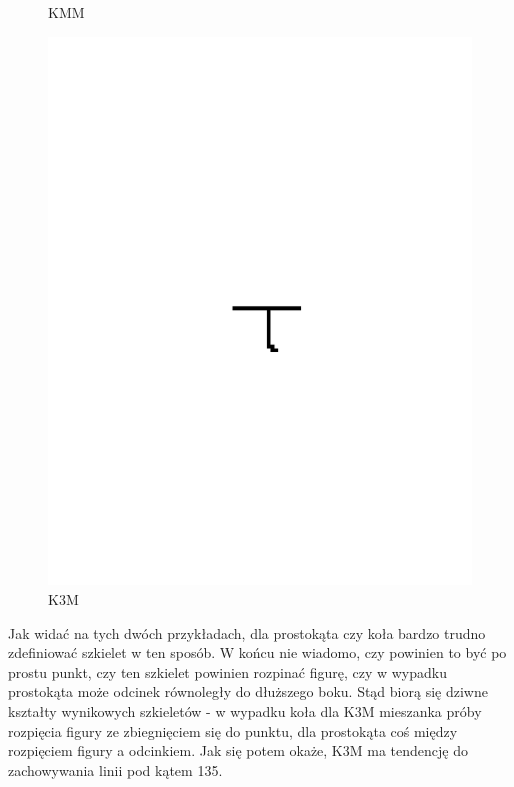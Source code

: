 \documentclass[11pt]{article}
\begin{document}
\begin{figure}[!ht]
\begin{minipage}[b]{0.5\linewidth}
    \caption{KMM} 
    \vspace{4ex}
  \end{minipage}%
  \begin{minipage}[b]{0.5\linewidth}
    \centering
    \includegraphics[width=.5\linewidth]{../samples/circle_k3m} 
    \caption{K3M} 
    \vspace{4ex}
  \end{minipage} 
\end{figure}
\FloatBarrier

\par
Jak widać na tych dwóch przykładach, dla prostokąta czy koła bardzo trudno zdefiniować szkielet w ten sposób. W końcu nie wiadomo, czy powinien to być po prostu punkt, czy ten szkielet powinien rozpinać figurę, czy w wypadku prostokąta może odcinek równoległy do dłuższego boku. Stąd biorą się dziwne kształty wynikowych szkieletów - w wypadku koła dla K3M mieszanka próby rozpięcia figury ze zbiegnięciem się do punktu, dla prostokąta coś między rozpięciem figury a odcinkiem. Jak się potem okaże, K3M ma tendencję do zachowywania linii pod kątem 135\degree.
\end{document}
